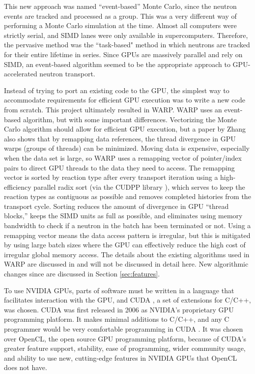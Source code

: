\documentclass[preprint,12pt]{elsarticle}
\begin{document}
This new approach was named ``event-based'' Monte Carlo, since the neutron events are tracked and processed as a group.  This was a very different way of performing a Monte Carlo simulation at the time.  Almost all computers were strictly serial, and SIMD lanes were only available in supercomputers.  Therefore, the pervasive method was the ``task-based" method in which neutrons are tracked for their entire lifetime in series.  Since GPUs are massively parallel and rely on SIMD, an event-based algorithm seemed to be the appropriate approach to GPU-accelerated neutron transport.  

Instead of trying to port an existing code to the GPU, the simplest way to accommodate requirements for efficient GPU execution was to write a new code from scratch.  This project ultimately resulted in WARP.  WARP uses an event-based algorithm, but with some important differences.  Vectorizing the Monte Carlo algorithm should allow for efficient GPU execution, but a paper by Zhang \cite{on_the_fly_remapping} also shows that by remapping data references, the thread divergence in GPU warps (groups of threads) can be minimized. Moving data is expensive, especially when the data set is large, so WARP uses a remapping vector of pointer/index pairs to direct GPU threads to the data they need to access.  The remapping vector is sorted  by reaction type after every transport iteration using a high-efficiency parallel radix sort (via the CUDPP library \cite{CUDPP}), which serves to keep the reaction types as contiguous as possible and removes completed histories from the transport cycle.  Sorting reduces the amount of divergence in GPU ``thread blocks,'' keeps the SIMD units as full as possible, and eliminates using memory bandwidth to check if a neutron in the batch has been terminated or not.  Using a remapping vector means the data access pattern is irregular, but this is mitigated by using large batch sizes where the GPU can effectively reduce the high cost of irregular global memory access.  The details about the existing algorithms used in WARP are discussed in \cite{algorithms} and will not be discussed in detail here.  New algorithmic changes since are discussed in Section \ref{sec:features}.

To use NVIDIA GPUs, parts of software must be written in a language that facilitates interaction with the GPU, and CUDA \cite{cuda}, a set of extensions for C/C++, was chosen.  CUDA was first released in 2006 as NVIDIA's proprietary GPU programming platform.  It makes minimal additions to C/C++, and any C programmer would be very comfortable programming in CUDA \cite{cuda}.  It was chosen over OpenCL, the open source GPU programming platform, because of CUDA's greater feature support, stability, ease of programming, wider community usage, and ability to use new, cutting-edge features in NVIDIA GPUs that OpenCL does not have.
\end{document}
